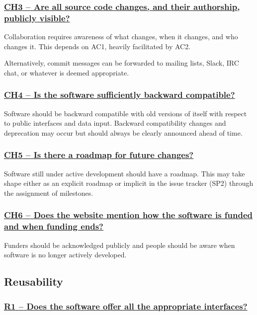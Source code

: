 \documentclass[a4paper,11pt]{article}
\newcommand{\indicator}[1]{\subsubsection*{\underline{#1}}}
\begin{document}
\newcommand{\chThreeName}{CH3}
\newcommand{\chThreeID}{\chThreeName}
\newcommand{\chThreeText}{Are all source code changes, and their authorship, publicly visible?}
\indicator{\chThreeName{ }--{ }\chThreeText}\label{id:ch3} 

Collaboration requires awareness of what changes, when it changes, and who
changes it. This depends on AC1, heavily facilitated by AC2.

Alternatively, commit messages can be forwarded to mailing lists, Slack, IRC chat, or
whatever is deemed appropriate.

\newcommand{\chFourName}{CH4}
\newcommand{\chFourID}{\chFourName}
\newcommand{\chFourText}{Is the software sufficiently backward compatible?}
\indicator{\chFourName{ }--{ }\chFourText}\label{id:ch4} 

Software should be backward compatible with old versions of itself with respect
to public interfaces and data input. Backward compatibility changes and
deprecation may occur but should always be clearly announced ahead of time.

\newcommand{\chFiveName}{CH5}
\newcommand{\chFiveID}{\chFiveName}
\newcommand{\chFiveText}{Is there a roadmap for future changes?}
\indicator{\chFiveName{ }--{ }\chFiveText}\label{id:ch5} 

Software still under active development should have a roadmap. This may take
shape either as an explicit roadmap or implicit in the issue tracker
(SP2) through the assignment of milestones.

\newcommand{\chSixName}{CH6}
\newcommand{\chSixID}{\chSixName}
\newcommand{\chSixText}{Does the website mention how the software is funded and when funding ends?}
\indicator{\chSixName{ }--{ }\chSixText}\label{id:ch6} 

Funders should be acknowledged publicly and people should be aware when
software is no longer actively developed.

\subsection{Reusability}\label{sec:reu}

\newcommand{\rOneName}{R1}
\newcommand{\rOneID}{\rOneName}
\newcommand{\rOneText}{Does the software offer all the appropriate interfaces?}
\indicator{\rOneName{ }--{ }\rOneText}\label{id:r1} 
\end{document}
